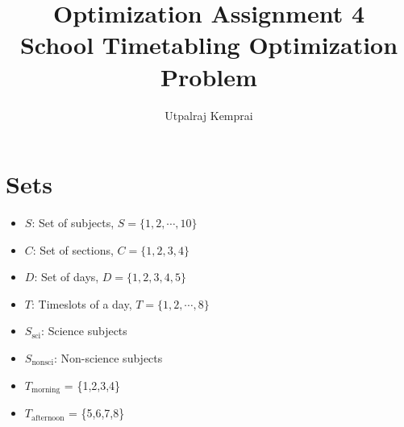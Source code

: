 \documentclass[11pt]{article}
\begin{document}
\title{Optimization Assignment 4 \\School Timetabling Optimization Problem}
\author{Utpalraj Kemprai}
\date{}
\maketitle

\section*{Sets}
\begin{itemize}
    \item $S$: Set of subjects, $S = \{1,2,\cdots, 10\}$
    \item $C$: Set of sections, $C = \{1,2,3,4\}$
    \item $D$: Set of days, $D = \{1,2,3,4,5\}$
    \item $T$: Timeslots of a day, $T = \{1,2,\cdots,8\}$
    \item $S_{\text{sci}}$: Science subjects
    \item $S_{\text{nonsci}}$: Non-science subjects
    \item $T_{\text{morning}}$ = \{1,2,3,4\}
    \item $T_{\text{afternoon}}$ = \{5,6,7,8\}
\end{itemize}
\end{document}
